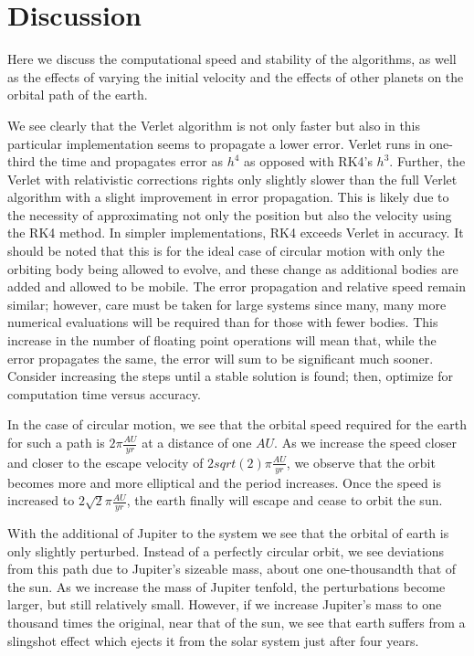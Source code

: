 \documentclass[11pt,a4paper]{article}
\begin{document}
\section{Discussion}

Here we discuss the computational speed and stability of the algorithms, as well as the effects of varying the initial velocity and the effects of other planets on the orbital path of the earth. 

We see clearly that the Verlet algorithm is not only faster but also in this particular implementation seems to propagate a lower error. Verlet runs in one-third the time and propagates error as $h^4$ as opposed with RK4's $h^3$. Further, the Verlet with relativistic corrections rights only slightly slower than the full Verlet algorithm with a slight improvement in error propagation. This is likely due to the necessity of approximating not only the position but also the velocity using the RK4 method. In simpler implementations, RK4 exceeds Verlet in accuracy. It should be noted that this is for the ideal case of circular motion with only the orbiting body being allowed to evolve, and these change as additional bodies are added and allowed to be mobile. The error propagation and relative speed remain similar; however, care must be taken for large systems since many, many more numerical evaluations will be required than for those with fewer bodies. This increase in the number of floating point operations will mean that, while the error propagates the same, the error will sum to be significant much sooner. Consider increasing the steps until a stable solution is found; then, optimize for computation time versus accuracy.

In the case of circular motion, we see that the orbital speed required for the earth for such a path is $2\pi \frac{AU}{yr}$ at a distance of one $AU$. As we increase the speed closer and closer to the escape velocity of $2sqrt(2)\pi \frac{AU}{yr}$, we observe that the orbit becomes more and more elliptical and the period increases. Once the speed is increased to $2\sqrt{2}\pi \frac{AU}{yr}$, the earth finally will escape and cease to orbit the sun.

With the additional of Jupiter to the system we see that the orbital of earth is only slightly perturbed. Instead of a perfectly circular orbit, we see deviations from this path due to Jupiter's sizeable mass, about one one-thousandth that of the sun. As we increase the mass of Jupiter tenfold, the perturbations become larger, but still relatively small. However, if we increase Jupiter's mass to one thousand times the original, near that of the sun, we see that earth suffers from a slingshot effect which ejects it from the solar system just after four years. 
\end{document}
